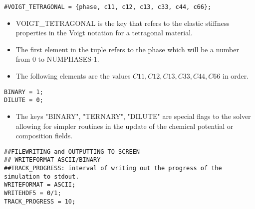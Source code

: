 \documentclass[a4paper,10pt]{article}
\begin{document}
\begin{lstlisting}
#VOIGT_TETRAGONAL = {phase, c11, c12, c13, c33, c44, c66};
\end{lstlisting}

\begin{itemize}
 \item VOIGT\_TETRAGONAL is the key that refers to the elastic stiffness properties in the Voigt notation for a tetragonal material. 
 \item The first element in the tuple refers to the phase which will be a number from 0 to NUMPHASES-1.
 \item The following elements are the values $C11,C12,C13,C33,C44,C66$ in order.
\end{itemize}

\begin{lstlisting}
BINARY = 1;
DILUTE = 0;
\end{lstlisting}

\begin{itemize}
 \item The keys "BINARY", "TERNARY", "DILUTE" are special flags to the solver allowing for simpler routines in the update of the chemical potential or composition fields.
\end{itemize}

\begin{lstlisting}
##FILEWRITING and OUTPUTTING TO SCREEN
## WRITEFORMAT ASCII/BINARY
##TRACK_PROGRESS: interval of writing out the progress of the simulation to stdout. 
WRITEFORMAT = ASCII;
WRITEHDF5 = 0/1;
TRACK_PROGRESS = 10;
\end{lstlisting}
\end{document}
